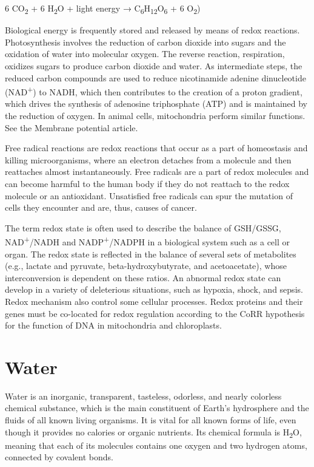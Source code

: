6 CO\textsubscript{2} + 6 H\textsubscript{2}O + light energy → C\textsubscript{6}H\textsubscript{12}O\textsubscript{6} + 6 O\textsubscript{2})

Biological energy is frequently stored and released by means of redox reactions. Photosynthesis involves the reduction of carbon dioxide into sugars and the oxidation of water into molecular oxygen. The reverse reaction, respiration, oxidizes sugars to produce carbon dioxide and water. As intermediate steps, the reduced carbon compounds are used to reduce nicotinamide adenine dinucleotide (NAD\textsuperscript{+}) to NADH, which then contributes to the creation of a proton gradient, which drives the synthesis of adenosine triphosphate (ATP) and is maintained by the reduction of oxygen. In animal cells, mitochondria perform similar functions. See the Membrane potential article.

Free radical reactions are redox reactions that occur as a part of homeostasis and killing microorganisms, where an electron detaches from a molecule and then reattaches almost instantaneously. Free radicals are a part of redox molecules and can become harmful to the human body if they do not reattach to the redox molecule or an antioxidant. Unsatisfied free radicals can spur the mutation of cells they encounter and are, thus, causes of cancer.

The term redox state is often used to describe the balance of GSH/GSSG, NAD\textsuperscript{+}/NADH and NADP\textsuperscript{+}/NADPH in a biological system such as a cell or organ. The redox state is reflected in the balance of several sets of metabolites (e.g., lactate and pyruvate, beta-hydroxybutyrate, and acetoacetate), whose interconversion is dependent on these ratios. An abnormal redox state can develop in a variety of deleterious situations, such as hypoxia, shock, and sepsis. Redox mechanism also control some cellular processes. Redox proteins and their genes must be co-located for redox regulation according to the CoRR hypothesis for the function of DNA in mitochondria and chloroplasts.

\hypertarget{water}{%
\section{Water}\label{water}}

Water is an inorganic, transparent, tasteless, odorless, and nearly colorless chemical substance, which is the main constituent of Earth's hydrosphere and the fluids of all known living organisms. It is vital for all known forms of life, even though it provides no calories or organic nutrients. Its chemical formula is H\textsubscript{2}O, meaning that each of its molecules contains one oxygen and two hydrogen atoms, connected by covalent bonds.

